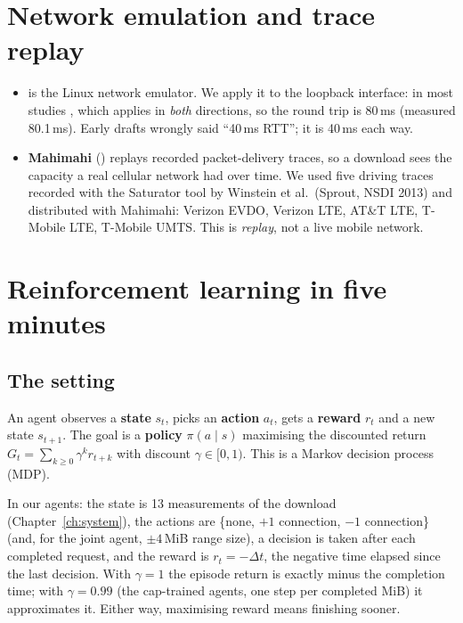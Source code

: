 \section{Network emulation and trace replay}
\begin{itemize}
\item \textbf{} is the Linux network emulator. We apply it to the loopback interface: in most studies , which applies in \emph{both} directions, so the round trip is 80\,ms (measured 80.1\,ms). Early drafts wrongly said ``40\,ms RTT''; it is 40\,ms each way.
\item \textbf{Mahimahi} () replays recorded packet-delivery traces, so a download sees the capacity a real cellular network had over time. We used five driving traces recorded with the Saturator tool by Winstein et al.\ (Sprout, NSDI 2013) and distributed with Mahimahi: Verizon EVDO, Verizon LTE, AT\&T LTE, T-Mobile LTE, T-Mobile UMTS. This is \emph{replay}, not a live mobile network.
\end{itemize}

\section{Reinforcement learning in five minutes}
\subsection{The setting}
An agent observes a \textbf{state} $s_t$, picks an \textbf{action} $a_t$, gets a \textbf{reward} $r_t$ and a new state $s_{t+1}$. The goal is a \textbf{policy} $\pi(a\mid s)$ maximising the discounted return $G_t = \sum_{k\ge0}\gamma^k r_{t+k}$ with discount $\gamma\in[0,1)$. This is a Markov decision process (MDP).

In our agents: the state is 13 measurements of the download (Chapter~\ref{ch:system}), the actions are \{none, $+1$ connection, $-1$ connection\} (and, for the joint agent, $\pm4$\,MiB range size), a decision is taken after each completed request, and the reward is $r_t = -\Delta t$, the negative time elapsed since the last decision. With $\gamma=1$ the episode return is exactly minus the completion time; with $\gamma=0.99$ (the cap-trained agents, one step per completed MiB) it approximates it. Either way, maximising reward means finishing sooner.

